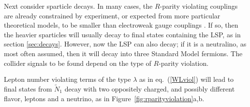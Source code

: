 \documentclass[12pt]{article}
\def\stilde{\widetilde}
\begin{document}
Next consider sparticle decays. In many cases, the $R$-parity violating
couplings are already constrained by experiment, or expected from more
particular theoretical models, to be smaller than electroweak gauge
couplings \cite{RPVreviews}. If so, then the heavier sparticles will
usually decay to final states containing the LSP, as in section
\ref{sec:decays}. However, now the LSP can also decay; if it is a
neutralino, as most often assumed, then it will decay into three Standard
Model fermions. The collider signals to be found depend on the type of
$R$-parity violation. 

Lepton number violating terms of the type $\lambda$ as in
eq.~(\ref{WLviol}) will lead to final states from $\stilde N_1$ decay with
two oppositely charged, and possibly different flavor, leptons and a
neutrino, as in Figure~\ref{fig:rparityviolation}a,b. 
\end{document}
